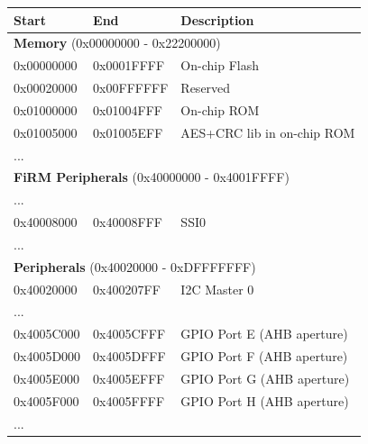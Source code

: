 \begin{center}
	\begin{table}
		\begin{tabular}{p{1.6cm}  p{1.6cm}  p{4cm}} 
			\hline
			Start & End & Description \\ 
			\hline
			\multicolumn{3}{l}{\textbf{Memory} (0x00000000 - 0x22200000)}  \\
			\hline
			0x00000000 & 0x0001FFFF & On-chip Flash \\ 
			\hline
			0x00020000 & 0x00FFFFFF & Reserved \\
			\hline
			0x01000000 & 0x01004FFF & On-chip ROM  \\
			\hline
			0x01005000 & 0x01005EFF & AES+CRC lib in on-chip ROM   \\
			\hline
			... & & \\
			\hline
			\multicolumn{3}{l}{\textbf{FiRM Peripherals} (0x40000000 - 0x4001FFFF)}  \\
			\hline
			... & & \\
			\hline
			0x40008000 & 0x40008FFF & SSI0 \\
			\hline
			... & & \\
			\hline
			\multicolumn{3}{l}{\textbf{Peripherals} (0x40020000 - 0xDFFFFFFF)}  \\
			\hline
			0x40020000 & 0x400207FF & I2C Master 0 \\
			\hline
			... & & \\
			\hline
			0x4005C000 & 0x4005CFFF & GPIO Port E (AHB aperture) \\
			\hline
			0x4005D000 & 0x4005DFFF & GPIO Port F (AHB aperture) \\
			\hline
			0x4005E000 & 0x4005EFFF & GPIO Port G (AHB aperture) \\
			\hline
			0x4005F000 & 0x4005FFFF & GPIO Port H (AHB aperture) \\
			\hline
			... & & \\
			\hline

\end{tabular}
\end{table}
\end{center}
